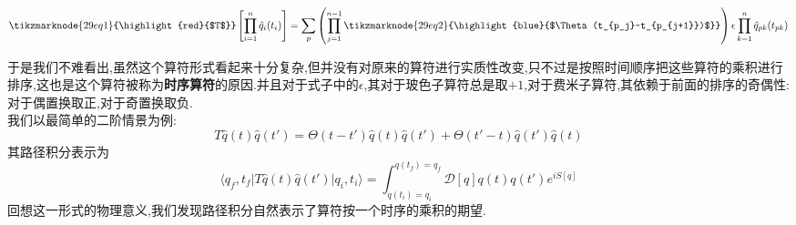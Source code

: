 \begin{equation}
	\vspace{\baselineskip}
	\tikzmarknode{29eq1}{\highlight{red}{$T$}}\left[\prod_{i=1}^n\hat{q}_i(t_i)\right]=\sum_p\left(\prod_{j=1}^{n-1}\tikzmarknode{29eq2}{\highlight{blue}{$\Theta(t_{p_j}-t_{p_{j+1}})$}}\right)\epsilon\prod_{k=1}^{n}\hat{q}_{pk}(t_{pk})
\end{equation}

于是我们不难看出,虽然这个算符形式看起来十分复杂,但并没有对原来的算符进行实质性改变,只不过是按照时间顺序把这些算符的乘积进行排序,这也是这个算符被称为\textbf{时序算符}的原因.并且对于式子中的$\epsilon$,其对于玻色子算符总是取$+1$,对于费米子算符,其依赖于前面的排序的奇偶性:对于偶置换取正,对于奇置换取负.\\
我们以最简单的二阶情景为例:
\begin{equation}
	T\hat{q}(t)\hat{q}(t')=\Theta(t-t')\hat{q}(t)\hat{q}(t')+\Theta(t'-t)\hat{q}(t')\hat{q}(t)
\end{equation}
其路径积分表示为
\begin{equation}
	\langle q_f,t_f|T\hat{q}(t)\hat{q}(t')|q_i,t_i\rangle=\int_{q(t_i)=q_i}^{q(t_f)=q_f}\mathcal{D}[q] q(t)q(t')e^{iS[q]}
\end{equation}
回想这一形式的物理意义,我们发现路径积分自然表示了算符按一个时序的乘积的期望.

